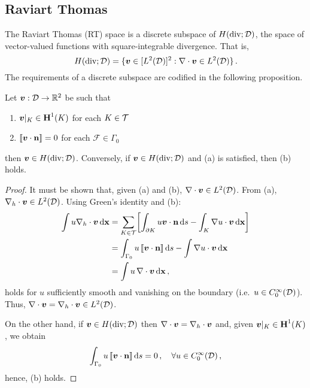 \documentclass[../doc.tex]{subfiles}
\begin{document}
\subsection{Raviart Thomas} \label{fem_sec:fes_rt}
The Raviart Thomas (RT) space is a discrete subspace of $H(\operatorname{div};\mathcal{D})$, the space of vector-valued functions with square-integrable divergence. That is, 
	\begin{equation}
		H(\operatorname{div};\mathcal{D}) = \{ \boldsymbol{v} \in [L^2(\mathcal{D})]^2 : \nabla\cdot\boldsymbol{v} \in L^2(\mathcal{D}) \} \,. 
	\end{equation}
The requirements of a discrete subspace are codified in the following proposition. 
\begin{prop} \label{fem:div_prop}
Let $\boldsymbol{v} : \mathcal{D} \rightarrow \mathbb{R}^2$ be such that 
\begin{enumerate}
	\item $\boldsymbol{v}|_K \in \boldsymbol{\mathrm{H}}^1(K)$ for each $K \in \mathcal{T}$  
	\item $\left\llbracket\boldsymbol{v}\cdot\boldsymbol{\mathrm{n}} \right\rrbracket = 0$ for each $\mathcal{F} \in \Gamma_0$ 
\end{enumerate}
then $\boldsymbol{v} \in H(\operatorname{div};\mathcal{D})$. Conversely, if $\boldsymbol{v} \in H(\operatorname{div};\mathcal{D})$ and (a) is satisfied, then (b) holds. 
\end{prop}
\begin{proof}
It must be shown that, given (a) and (b), $\nabla\cdot\boldsymbol{v} \in L^2(\mathcal{D})$. From (a), $\nabla_h\cdot\boldsymbol{v} \in L^2(\mathcal{D})$. Using Green's identity and (b): 
	\begin{equation}
	\begin{aligned}
		\int u\nabla_h\cdot\boldsymbol{v} \mathop{}\!\mathrm{d} \boldsymbol{\mathrm{x}} &= \sum_{K\in\mathcal{T}} \!\left[ \int_{\partial K} u \boldsymbol{v}\cdot\boldsymbol{\mathrm{n}} \mathop{}\!\mathrm{d} s - \int_K \nabla u \cdot \boldsymbol{v} \mathop{}\!\mathrm{d} \boldsymbol{\mathrm{x}}  \right] \\
		&= \int_{\Gamma_0} u \left\llbracket\boldsymbol{v}\cdot\boldsymbol{\mathrm{n}} \right\rrbracket \mathop{}\!\mathrm{d} s - \int \nabla u \cdot \boldsymbol{v} \mathop{}\!\mathrm{d} \boldsymbol{\mathrm{x}} \\
		&= \int u\, \nabla\cdot\boldsymbol{v} \mathop{}\!\mathrm{d} \boldsymbol{\mathrm{x}} \,, 
	\end{aligned}
	\end{equation}
holds for $u$ sufficiently smooth and vanishing on the boundary (i.e.~$u \in C_0^\infty(\mathcal{D})$). Thus, $\nabla\cdot\boldsymbol{v} = \nabla_h\cdot\boldsymbol{v} \in L^2(\mathcal{D})$. 

On the other hand, if $\boldsymbol{v} \in H(\operatorname{div};\mathcal{D})$ then $\nabla\cdot\boldsymbol{v} = \nabla_h\cdot\boldsymbol{v}$ and, given $\boldsymbol{v}|_K \in \boldsymbol{\mathrm{H}}^1(K)$, we obtain 
	\begin{equation}
		\int_{\Gamma_0} u \left\llbracket\boldsymbol{v}\cdot\boldsymbol{\mathrm{n}} \right\rrbracket \mathop{}\!\mathrm{d} s = 0 \,, \quad \forall u \in C_0^\infty(\mathcal{D}) \,, 
	\end{equation}
hence, (b) holds.
\end{proof}
\end{document}

